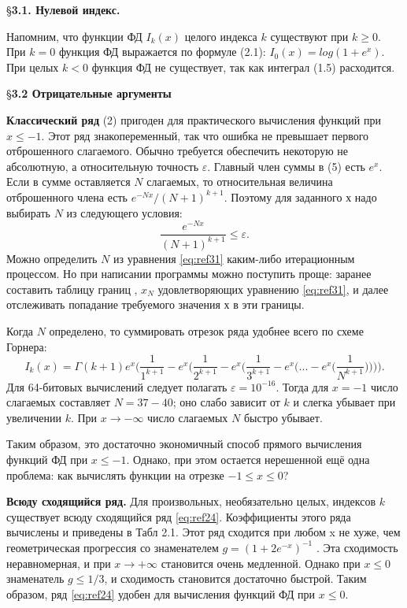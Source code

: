 \S \textbf{3.1. Нулевой индекс.}

Напомним, что функции ФД $I_k(x)$ целого индекса $k$ существуют при $k \geqslant 0$. При $k = 0$ функция ФД выражается по формуле (2.1): $I_0(x)=log(1+e^x).$ При целых $k < 0$ функция ФД не существует, так как интеграл (1.5) расходится.

\S \textbf{3.2 Отрицательные аргументы}

\textbf{Классический ряд} (2) пригоден для практического вычисления функций
при $x \leqslant -1$. Этот ряд знакопеременный, так что ошибка не превышает первого
отброшенного слагаемого. Обычно требуется обеспечить некоторую не
абсолютную, а относительную точность $\varepsilon$. Главный член суммы в (5) есть $e^{x}$.
Если в сумме оставляется $N$ слагаемых, то относительная величина
отброшенного члена есть $e^{-Nx}/(N+1)^{k+1}$. Поэтому для заданного $х$ надо
выбирать $N$ из следующего условия:
\begin{equation}
\frac{e^{-Nx}}{(N+1)^{k+1}} \leqslant \varepsilon.
\label{eq:ref31}
\end{equation}
Можно определить $N$ из уравнения \ref{eq:ref31} каким-либо итерационным
процессом. Но при написании программы можно поступить проще: заранее
составить таблицу границ , $x_{N}$ удовлетворяющих уравнению \ref{eq:ref31}, и далее
отслеживать попадание требуемого значения $х$ в эти границы.

Когда $N$ определено, то суммировать отрезок ряда удобнее всего по схеме Горнера:
\begin{equation}
I_k(x)=\Gamma(k+1)e^{x}\Bigg(\frac{1}{1^{k+1}}-e^{x}\Bigg(\frac{1}{2^{k+1}}-e^{x}\Bigg(\frac{1}{3^{k+1}}-e^{x}\Bigg(...-e^{x}\Bigg(\frac{1}{N^{k+1}}\Bigg)\Bigg)\Bigg)\Bigg).
\end{equation}
Для 64-битовых вычислений следует полагать  $\varepsilon = 10^{-16}$. Тогда для $x = -1$
число слагаемых составляет $N = 37 - 40$; оно слабо зависит от $k$ и слегка
убывает при увеличении $k$. При $x \to -\infty$ число слагаемых $N$ быстро убывает.

Таким образом, это достаточно экономичный способ прямого вычисления функций ФД при $x \leqslant -1$. Однако, при этом остается нерешенной ещё одна проблема: как вычислять функции на отрезке $-1 \leqslant x \leqslant 0$?

\textbf{Всюду сходящийся ряд.} Для произвольных, необязательно целых,
индексов $k$ существует всюду сходящийся ряд \ref{eq:ref24}.
Коэффициенты этого ряда вычислены и приведены в Табл 2.1.
Этот ряд сходится при любом x не хуже, чем геометрическая прогрессия со
знаменателем $g = (1 + 2e^{-x})^{-1}$ . Эта сходимость неравномерная, и при $x \to +\infty$
становится очень медленной. Однако при $x \leqslant 0$ знаменатель $g \leqslant 1/3$, и
сходимость становится достаточно быстрой. Таким образом, ряд \ref{eq:ref24} удобен для
вычисления функций ФД при $x \leqslant 0$.

